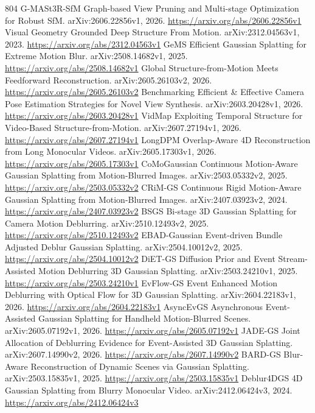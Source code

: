 \documentclass[11pt]{article}
\begin{document}
\begin{thebibliography}{804}
 G-MASt3R-SfM Graph-based View Pruning and Multi-stage Optimization for Robust SfM. arXiv:2606.22856v1, 2026. \url{https://arxiv.org/abs/2606.22856v1}
 Visual Geometry Grounded Deep Structure From Motion. arXiv:2312.04563v1, 2023. \url{https://arxiv.org/abs/2312.04563v1}
 GeMS Efficient Gaussian Splatting for Extreme Motion Blur. arXiv:2508.14682v1, 2025. \url{https://arxiv.org/abs/2508.14682v1}
 Global Structure-from-Motion Meets Feedforward Reconstruction. arXiv:2605.26103v2, 2026. \url{https://arxiv.org/abs/2605.26103v2}
 Benchmarking Efficient \& Effective Camera Pose Estimation Strategies for Novel View Synthesis. arXiv:2603.20428v1, 2026. \url{https://arxiv.org/abs/2603.20428v1}
 VidMap Exploiting Temporal Structure for Video-Based Structure-from-Motion. arXiv:2607.27194v1, 2026. \url{https://arxiv.org/abs/2607.27194v1}
 LongDPM Overlap-Aware 4D Reconstruction from Long Monocular Videos. arXiv:2605.17303v1, 2026. \url{https://arxiv.org/abs/2605.17303v1}
 CoMoGaussian Continuous Motion-Aware Gaussian Splatting from Motion-Blurred Images. arXiv:2503.05332v2, 2025. \url{https://arxiv.org/abs/2503.05332v2}
 CRiM-GS Continuous Rigid Motion-Aware Gaussian Splatting from Motion-Blurred Images. arXiv:2407.03923v2, 2024. \url{https://arxiv.org/abs/2407.03923v2}
 BSGS Bi-stage 3D Gaussian Splatting for Camera Motion Deblurring. arXiv:2510.12493v2, 2025. \url{https://arxiv.org/abs/2510.12493v2}
 EBAD-Gaussian Event-driven Bundle Adjusted Deblur Gaussian Splatting. arXiv:2504.10012v2, 2025. \url{https://arxiv.org/abs/2504.10012v2}
 DiET-GS Diffusion Prior and Event Stream-Assisted Motion Deblurring 3D Gaussian Splatting. arXiv:2503.24210v1, 2025. \url{https://arxiv.org/abs/2503.24210v1}
 EvFlow-GS Event Enhanced Motion Deblurring with Optical Flow for 3D Gaussian Splatting. arXiv:2604.22183v1, 2026. \url{https://arxiv.org/abs/2604.22183v1}
 AsyncEvGS Asynchronous Event-Assisted Gaussian Splatting for Handheld Motion-Blurred Scenes. arXiv:2605.07192v1, 2026. \url{https://arxiv.org/abs/2605.07192v1}
 JADE-GS Joint Allocation of Deblurring Evidence for Event-Assisted 3D Gaussian Splatting. arXiv:2607.14990v2, 2026. \url{https://arxiv.org/abs/2607.14990v2}
 BARD-GS Blur-Aware Reconstruction of Dynamic Scenes via Gaussian Splatting. arXiv:2503.15835v1, 2025. \url{https://arxiv.org/abs/2503.15835v1}
 Deblur4DGS 4D Gaussian Splatting from Blurry Monocular Video. arXiv:2412.06424v3, 2024. \url{https://arxiv.org/abs/2412.06424v3}

\end{thebibliography}
\end{document}
